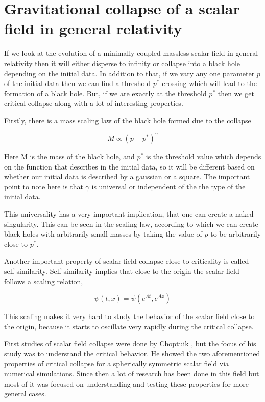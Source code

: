 \chapter{Gravitational collapse of a scalar field in general relativity}

If we look at the evolution of a minimally coupled massless scalar field in general relativity then it will either disperse to infinity or collapse into a black hole depending on the initial data. In addition to that, if we vary any one parameter $p$ of the initial data then we can find a threshold $p^*$ crossing which will lead to the formation of a black hole. But, if we are exactly at the threshold $p^*$ then we get critical collapse along with a lot of interesting properties.

Firstly, there is a mass scaling law of the black hole formed due to the collapse

\begin{equation*}
    M \propto (p - p^*)^\gamma
\end{equation*}

Here M is the mass of the black hole, and $p^*$ is the threshold value which depends on the function that describes in the initial data, so it will be different based on whether our initial data is described by a gaussian or a square. The important point to note here is that $\gamma$ is universal or independent of the the type of the initial data.

This universality has a very important implication, that one can create a naked singularity. This can be seen in the scaling law, according to which we can create black holes with arbitrarily small masses by taking the value of $p$ to be arbitrarily close to $p^*$.

Another important property of scalar field collapse close to criticality is called self-similarity. Self-similarity implies that close to the origin the scalar field follows a scaling relation,

\begin{equation*}
    \psi(t,x) = \psi(e^{At},e^{Ax})
\end{equation*}

This scaling makes it very hard to study the behavior of the scalar field close to the origin, because it starts to oscillate very rapidly during the critical collapse.

First studies of scalar field collapse were done by Choptuik \citep{Gundlach:2007gc}, but the focus of his study was to understand the critical behavior. He showed the two aforementioned properties of critical collapse for a spherically symmetric scalar field via numerical simulations. Since then a lot of research has been done in this field but most of it was focused on understanding and testing these properties for more general cases.

